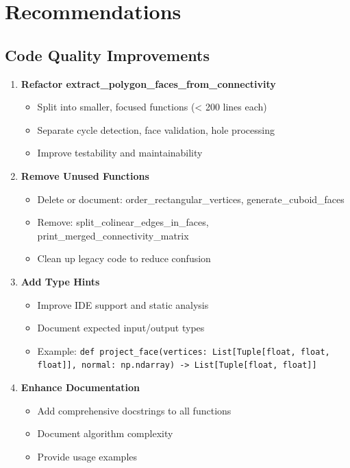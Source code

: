 \documentclass[11pt,a4paper]{article}
\begin{document}
\newpage
\section{Recommendations}

\subsection{Code Quality Improvements}

\begin{enumerate}
    \item \textbf{Refactor extract\_polygon\_faces\_from\_connectivity}
    \begin{itemize}
        \item Split into smaller, focused functions (< 200 lines each)
        \item Separate cycle detection, face validation, hole processing
        \item Improve testability and maintainability
    \end{itemize}
    
    \item \textbf{Remove Unused Functions}
    \begin{itemize}
        \item Delete or document: order\_rectangular\_vertices, generate\_cuboid\_faces
        \item Remove: split\_colinear\_edges\_in\_faces, print\_merged\_connectivity\_matrix
        \item Clean up legacy code to reduce confusion
    \end{itemize}
    
    \item \textbf{Add Type Hints}
    \begin{itemize}
        \item Improve IDE support and static analysis
        \item Document expected input/output types
        \item Example: \texttt{def project\_face(vertices: List[Tuple[float, float, float]], normal: np.ndarray) -> List[Tuple[float, float]]}
    \end{itemize}
    
    \item \textbf{Enhance Documentation}
    \begin{itemize}
        \item Add comprehensive docstrings to all functions
        \item Document algorithm complexity
        \item Provide usage examples
    \end{itemize}
\end{enumerate}
\end{document}
